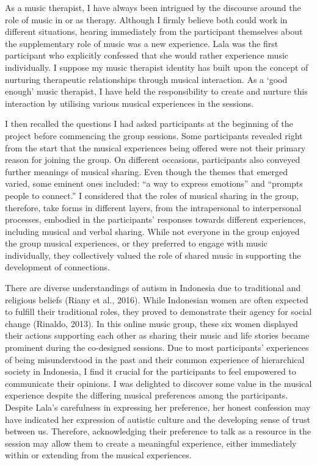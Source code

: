 \documentclass[authordate, empirical]{jote-new-article}
\begin{document}
	As a music therapist, I have always been intrigued by the discourse around the role of music in or as therapy. Although I firmly believe both could work in different situations, hearing immediately from the participant themselves about the supplementary role of music was a new experience. Lala was the first participant who explicitly confessed that she would rather experience music individually. I suppose my music therapist identity has built upon the concept of nurturing therapeutic relationships through musical interaction. As a ‘good enough' music therapist, I have held the responsibility to create and nurture this interaction by utilising various musical experiences in the sessions.



	I then recalled the questions I had asked participants at the beginning of the project before commencing the group sessions. Some participants revealed right from the start that the musical experiences being offered were not their primary reason for joining the group. On different occasions, participants also conveyed further meanings of musical sharing. Even though the themes that emerged varied, some eminent ones included: “a way to express emotions” and “prompts people to connect.” I considered that the roles of musical sharing in the group, therefore, take forms in different layers, from the intrapersonal to interpersonal processes, embodied in the participants' responses towards different experiences, including musical and verbal sharing. While not everyone in the group enjoyed the group musical experiences, or they preferred to engage with music individually, they collectively valued the role of shared music in supporting the development of connections.



	There are diverse understandings of autism in Indonesia due to traditional and religious beliefs (Riany et al., 2016). While Indonesian women are often expected to fulfill their traditional roles, they proved to demonstrate their agency for social change (Rinaldo, 2013). In this online music group, these six women displayed their actions supporting each other as sharing their music and life stories became prominent during the co-designed sessions. Due to most participants' experiences of being misunderstood in the past and their common experience of hierarchical society in Indonesia, I find it crucial for the participants to feel empowered to communicate their opinions. I was delighted to discover some value in the musical experience despite the differing musical preferences among the participants. Despite Lala's carefulness in expressing her preference, her honest confession may have indicated her expression of autistic culture and the developing sense of trust between us. Therefore, acknowledging their preference to talk as a resource in the session may allow them to create a meaningful experience, either immediately within or extending from the musical experiences.
\end{document}
